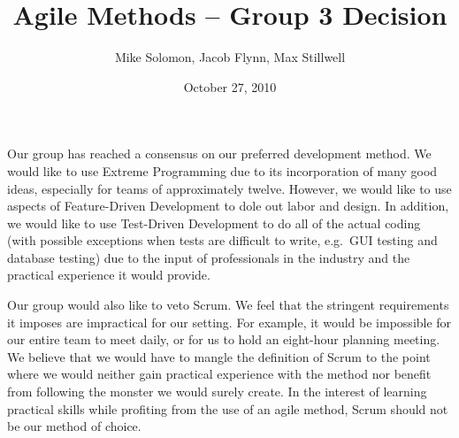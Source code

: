 \documentclass[12pt]{article}
\begin{document}
\title{Agile Methods -- Group 3 Decision}
\date{October 27, 2010}
\author{Mike Solomon, Jacob Flynn, Max Stillwell}
\maketitle

Our group has reached a consensus on our preferred development method.  We would like to use Extreme Programming due to its incorporation of many good ideas, especially for teams of approximately twelve.  However, we would like to use aspects of Feature-Driven Development to dole out labor and design.  In addition, we would like to use Test-Driven Development to do all of the actual coding (with possible exceptions when tests are difficult to write, e.g.\ GUI testing and database testing) due to the input of professionals in the industry and the practical experience it would provide.


Our group would also like to veto Scrum.  We feel that the stringent requirements it imposes are impractical for our setting.  For example, it would be impossible for our entire team to meet daily, or for us to hold an eight-hour planning meeting.  We believe that we would have to mangle the definition of Scrum to the point where we would neither gain practical experience with the method nor benefit from following the monster we would surely create.  In the interest of learning practical skills while profiting from the use of an agile method, Scrum should not be our method of choice.
\end{document}
